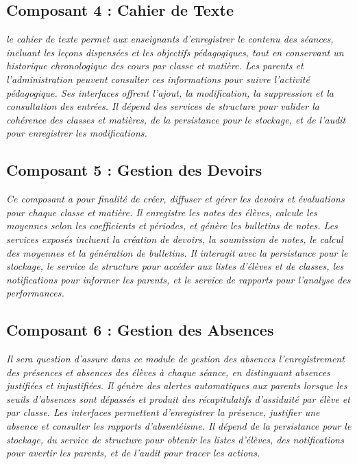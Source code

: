 \subsection{Composant 4 : Cahier de Texte}

\textit{le cahier de texte permet aux enseignants d’enregistrer le contenu des séances, incluant les leçons dispensées et les objectifs pédagogiques, tout en conservant un historique chronologique des cours par classe et matière. Les parents et l’administration peuvent consulter ces informations pour suivre l’activité pédagogique. Ses interfaces offrent l’ajout, la modification, la suppression et la consultation des entrées. Il dépend des services de structure pour valider la cohérence des classes et matières, de la persistance pour le stockage, et de l’audit pour enregistrer les modifications.}

\subsection{Composant 5 : Gestion des Devoirs}

\textit{Ce composant a pour finalité de créer, diffuser et gérer les devoirs et évaluations pour chaque classe et matière. Il enregistre les notes des élèves, calcule les moyennes selon les coefficients et périodes, et génère les bulletins de notes. Les services exposés incluent la création de devoirs, la soumission de notes, le calcul des moyennes et la génération de bulletins. Il interagit avec la persistance pour le stockage, le service de structure pour accéder aux listes d’élèves et de classes, les notifications pour informer les parents, et le service de rapports pour l’analyse des performances.}

\subsection{Composant 6 : Gestion des Absences}

\textit{ Il sera question d'assure dans ce module de gestion des absences l’enregistrement des présences et absences des élèves à chaque séance, en distinguant absences justifiées et injustifiées. Il génère des alertes automatiques aux parents lorsque les seuils d’absences sont dépassés et produit des récapitulatifs d’assiduité par élève et par classe. Les interfaces permettent d’enregistrer la présence, justifier une absence et consulter les rapports d’absentéisme. Il dépend de la persistance pour le stockage, du service de structure pour obtenir les listes d’élèves, des notifications pour avertir les parents, et de l’audit pour tracer les actions.}

